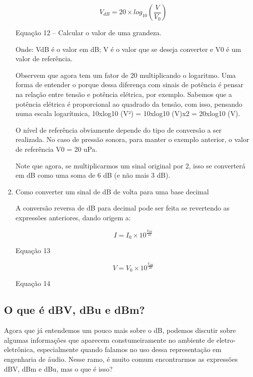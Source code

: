 \begin{enumerate}
    $$
    V_{dB}= 20 \times log_{10}\left ( \frac{V}{V_{0}} \right )
    $$
     \begin{center}
        Equação 12 – Calcular o valor de uma grandeza. 
    \end{center}
    
    Onde: VdB é o valor em dB; V é o valor que se deseja converter e V0 é um valor de referência.

    Observem que agora tem um fator de 20 multiplicando o logaritmo. Uma forma de entender o porque dessa diferença com sinais de potência é pensar na relação entre tensão e potência elétrica, por exemplo. Sabemos que a potência elétrica é proporcional ao quadrado da tensão, com isso, pensando numa escala logarítmica, 10xlog10 (V²) = 10xlog10 (V)x2 = 20xlog10 (V).

    O nível de referência obviamente depende do tipo de conversão a ser realizada. No caso de pressão sonora, para manter o exemplo anterior, o valor de referência V0 = 20 uPa. 

    Note que agora, se multiplicarmos um sinal original por 2, isso se converterá em dB como uma soma de 6 dB (e não mais 3 dB). 

    \item Como converter um sinal de dB de volta para uma base decimal
    
    A conversão reversa de dB para decimal pode ser feita se revertendo as expressões anteriores, dando origem a:
    
    $$
    I= I_{0}\times 10^{\frac{V_{dB}}{10}} 
    $$
     \begin{center}
        Equação 13
    \end{center}
    
    $$
    V= V_{0}\times 10^{\frac{V_{dB}}{20}}
    $$
    
    \begin{center}
        Equação 14
    \end{center}
 \end{enumerate}
 
 \subsection{O que é dBV, dBu e dBm?}
 Agora que já entendemos um pouco mais sobre o dB, podemos discutir sobre algumas informações que aparecem constumeiramente no ambiente de eletro-eletrônica, especialmente quando falamos no uso dessa representação em engenharia de áudio. Nesse ramo, é muito comum encontrarmos as expressões dBV, dBm e dBu, mas o que é isso?

